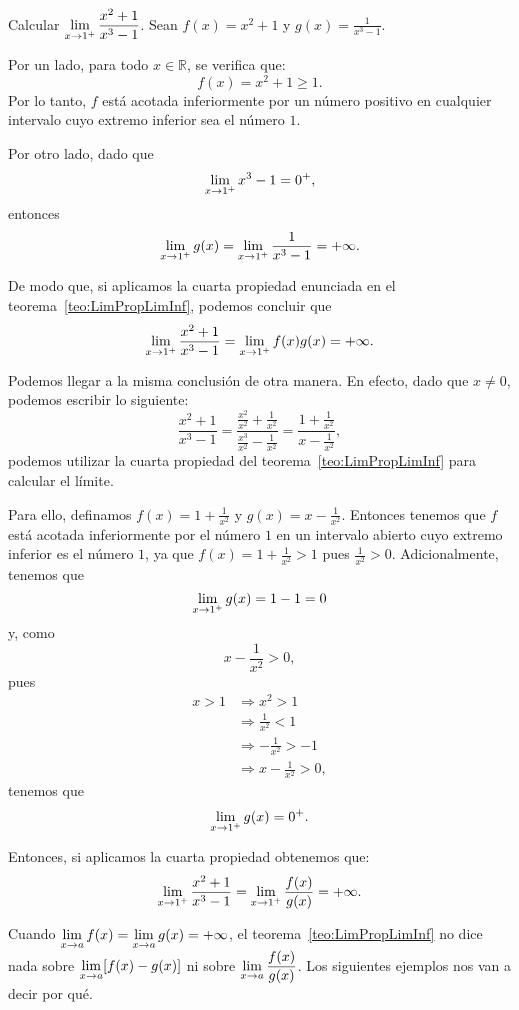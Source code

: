 \begin{exemplo}[Solución]{%
Calcular $\displaystyle\limjc{\frac{x^2 + 1}{x^3 - 1}}{x}{1^+}$.}%
Sean $f(x) = x^2 + 1$ y $\displaystyle g(x) = \frac{1}{x^3 - 1}$.

Por un lado, para todo $x\in\mathbb{R}$, se verifica que:
\[
f(x) = x^2 + 1 \geq 1.
\]
Por lo tanto, $f$ está acotada inferiormente por un número positivo en cualquier intervalo cuyo
extremo inferior sea el número $1$.

Por otro lado, dado que
\[
\limjc{x^3 - 1}{x}{1^+} = 0^+,
\]
entonces
\[
\limjc{g(x)}{x}{1^+} = \limjc{\frac{1}{x^3 - 1}}{x}{1^+} = +\infty.
\]

De modo que, si aplicamos la cuarta propiedad enunciada en el teorema~\ref{teo:LimPropLimInf},
podemos concluir que
\[
\limjc{\frac{x^2 + 1}{x^3 - 1}}{x}{1^+} = \limjc{f(x)g(x)}{x}{1^+} = +\infty.
\]

Podemos llegar a la misma conclusión de otra manera. En efecto, dado que $x\neq 0$, podemos
escribir lo siguiente:
\[
\frac{x^2 + 1}{x^3 - 1} = \frac{\displaystyle\frac{x^2}{x^2} + \frac{1}{x^2}}%
{\displaystyle\frac{x^3}{x^2} - \frac{1}{x^2}} =
\frac{\displaystyle 1 + \frac{1}{x^2}}{\displaystyle x - \frac{1}{x^2}},
\]
podemos utilizar la cuarta propiedad del teorema~\ref{teo:LimPropLimInf} para calcular el límite.

Para ello, definamos $f(x) = 1 + \frac{1}{x^2}$ y $g(x) = x - \frac{1}{x^2}$. Entonces tenemos que
$f$ está acotada inferiormente por el número $1$ en un intervalo abierto cuyo extremo inferior es
el número $1$, ya que $\displaystyle f(x) = 1 + \frac{1}{x^2} > 1$ pues $\displaystyle\frac{1}{x^2}
> 0$. Adicionalmente, tenemos que
\[
\limjc{g(x)}{x}{1^+} = 1 - 1 = 0
\]
y, como
\[
x - \frac{1}{x^2} > 0,
\]
pues
\begin{align*}
x > 1 &\Longrightarrow x^2 > 1 \\
&\Longrightarrow \frac{1}{x^2} < 1 \\
&\Longrightarrow -\frac{1}{x^2} > - 1 \\
&\Longrightarrow x - \frac{1}{x^2} > 0,
\end{align*}
tenemos que
\[
\limjc{g(x)}{x}{1^+} = 0^+.
\]

Entonces, si aplicamos la cuarta propiedad obtenemos que:
\[
\limjc{\frac{x^2 + 1}{x^3 - 1}}{x}{1^+} = \limjc{\frac{f(x)}{g(x)}}{x}{1^+} = +\infty.
\]
\end{exemplo}

Cuando $\displaystyle\limjc{f(x)}{x}{a} = \limjc{g(x)}{x}{a} = + \infty$, el
teorema~\ref{teo:LimPropLimInf} no dice nada sobre $\displaystyle\limjc{[f(x) - g(x)]}{x}{a}$ ni
sobre $\displaystyle\limjc{\frac{f(x)}{g(x)}}{x}{a}$. Los siguientes ejemplos nos van a decir por
qué.

